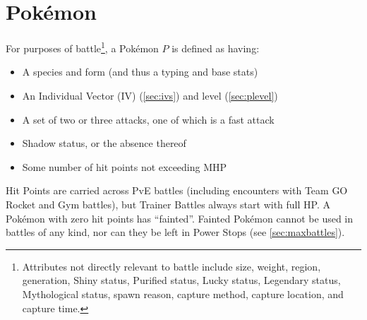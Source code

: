 \chapter{Pokémon}
\label{chap:pokemon}
For purposes of battle\footnote{Attributes not directly relevant to battle include size, weight, region,
generation, Shiny status, Purified status, Lucky status, Legendary status, Mythological status, spawn
reason, capture method, capture location, and capture time.}, a Pokémon $P$ is defined as having:
\begin{itemize}
\item A species and form (and thus a typing and base stats)
\item An Individual Vector (IV) (\autoref{sec:ivs}) and level (\autoref{sec:plevel})
\item A set of two or three attacks, one of which is a fast attack
\item Shadow status, or the absence thereof
\item Some number of hit points not exceeding MHP
\end{itemize}
Hit Points are carried across PvE battles (including encounters with
  Team GO Rocket and Gym battles), but Trainer Battles always start with full HP\@.
A Pokémon with zero hit points has ``fainted''.
Fainted Pokémon cannot be used in battles of any kind, nor can they be left in
 Power Stops (see \autoref{sec:maxbattles}).

